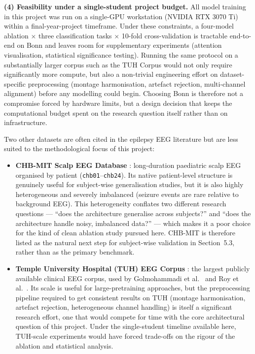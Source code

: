 \textbf{(4) Feasibility under a single-student project budget.} All model training in this project was run on a single-GPU workstation (NVIDIA RTX 3070 Ti) within a final-year-project timeframe. Under these constraints, a four-model ablation $\times$ three classification tasks $\times$ 10-fold cross-validation is tractable end-to-end on Bonn and leaves room for supplementary experiments (attention visualisation, statistical significance testing). Running the same protocol on a substantially larger corpus such as the TUH Corpus \cite{obeid2016} would not only require significantly more compute, but also a non-trivial engineering effort on dataset-specific preprocessing (montage harmonisation, artefact rejection, multi-channel alignment) before any modelling could begin. Choosing Bonn is therefore not a compromise forced by hardware limits, but a design decision that keeps the computational budget spent on the research question itself rather than on infrastructure.

Two other datasets are often cited in the epilepsy EEG literature but are less suited to the methodological focus of this project:

\begin{itemize}
    \item \textbf{CHB-MIT Scalp EEG Database} \cite{shoeb2010, goldberger2000}: long-duration paediatric scalp EEG organised by patient (\texttt{chb01}--\texttt{chb24}). Its native patient-level structure is genuinely useful for subject-wise generalisation studies, but it is also highly heterogeneous and severely imbalanced (seizure events are rare relative to background EEG). This heterogeneity conflates two different research questions --- ``does the architecture generalise across subjects?'' and ``does the architecture handle noisy, imbalanced data?'' --- which makes it a poor choice for the kind of clean ablation study pursued here. CHB-MIT is therefore listed as the natural next step for subject-wise validation in Section~5.3, rather than as the primary benchmark.
    \item \textbf{Temple University Hospital (TUH) EEG Corpus} \cite{obeid2016}: the largest publicly available clinical EEG corpus, used by Golmohammadi et al.\ \cite{golmohammadi2019} and Roy et al.\ \cite{roy2019}. Its scale is useful for large-pretraining approaches, but the preprocessing pipeline required to get consistent results on TUH (montage harmonisation, artefact rejection, heterogeneous channel handling) is itself a significant research effort, one that would compete for time with the core architectural question of this project. Under the single-student timeline available here, TUH-scale experiments would have forced trade-offs on the rigour of the ablation and statistical analysis.
\end{itemize}

